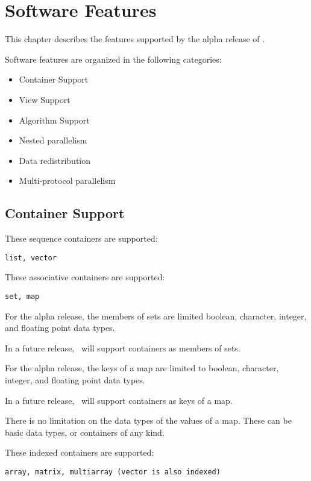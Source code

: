 \documentclass{report}
\begin{document}

\chapter{Software Features}

This chapter describes the features supported by the alpha release of \stapl.

Software features are organized in the following categories:

\begin{itemize}
\item
Container Support
\item
View Support
\item
Algorithm Support
\item
Nested parallelism
\item
Data redistribution
\item
Multi-protocol parallelism
\end{itemize}


\section{Container Support}

\noindent
These sequence containers are supported:

{\tt list, vector }

\noindent
These associative containers are supported:

{\tt set, map }

For the alpha release, the members of sets are limited  
boolean, character, integer, and floating point data types.

In a future release, \stapl\ will support containers as members of sets.

For the alpha release, the keys of a map are limited to 
boolean, character, integer, and floating point data types.

In a future release, \stapl\ will support containers as keys of a map.

There is no limitation on the data types of the values of a map.
These can be basic data types, or containers of any kind.

\noindent
These indexed containers are supported:

{\tt array, matrix, multiarray (vector is also indexed) }
\end{document}

